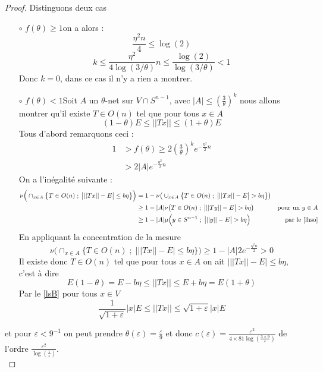 \documentclass[12pt]{article}
\theoremstyle{definition}
\begin{document}
\begin{proof}
	\noindent Distinguons deux cas 
	\begin{enumerate}[leftmargin=\labelsep]
		\item[$\circ$] {$f(\theta)\geq1$}\newline on a alors :
		\begin{equation*}
		\frac{\eta^2n}{4}\leq \log(2)
		\end{equation*}
		\begin{equation*}
		k\leq \frac{\eta^2}{4\log(3/\theta)}n\leq \frac{\log(2)}{\log(3/\theta)}<1
		\end{equation*}
		Donc $k=0$, dans ce cas il n'y a rien a montrer.
		\item[$\circ$] $f(\theta)<1$\newline Soit $A$ un $\theta$-net sur $V\cap S^{n-1}$, avec $|A|\leq(\frac{3}{\theta})^k$ nous allons montrer qu'il existe $T\in O(n)$ tel que pour tous $x\in A$ 
		\begin{equation*}
		(1-\theta) E \leq ||Tx|| \leq (1+ \theta)E
		\end{equation*}
		Tous d'abord remarquons ceci :
		\begin{align*}
		1&>f(\theta)\geq 2(\frac{3}{\theta})^ke^{-\frac{\eta^2}{2}n} \\
		&> 2|A|e^{-\frac{\eta^2}{2}n}
		\end{align*}
		On a l'inégalité suivante : 
		\begin{align*}
		\nu\Big(\cap_{x\in A}\big\{T\in O(n)\; ; \;  \big| ||Tx||-E \big|\leq b\eta\big\}\Big)& = 1-\nu\big(\cup_{x\in A}\big\{T\in O(n)\; ; \; \big| ||Tx||-E \big|>b\eta\big\}\big)& \\
		& \geq 1-|A|\nu\big(T\in O(n)\; ; \; \big| ||Ty||-E \big|>b\eta\big)& \text{pour un $y\in A$}\\
		& \geq 1 - |A|\mu\Big(y\in S^{n-1}\; ;\; \big| ||y||-E \big|>b\eta\Big) & \text{par le \cref{lhso}}
		\end{align*} 
		En appliquant la concentration de la mesure
		\begin{equation*}
		\nu\Big(\cap_{x\in A}\big\{T\in O(n)\; ; \;  \big| ||Tx||-E \big|\leq b\eta\big\}\Big)\geq 1 - |A|2e^{-\frac{\eta^2n}{2}} >0
		\end{equation*}	
		Il existe donc $T\in O(n)$ tel que pour tous $x\in A$ on ait $\big|||Tx||-E \big|\leq b \eta$, c'est à dire 
		\begin{equation*}
		E(1-\theta)=E-b\eta\leq ||Tx||\leq E+b\eta=E(1+\theta)
		\end{equation*}
		Par le \cref{lsB} pour tous $x\in V$
		\begin{equation*}
		\frac{1}{\sqrt{1+\varepsilon}}|x| E\leq ||Tx||\leq \sqrt{1+\varepsilon}|x| E
		\end{equation*}
	\end{enumerate}
	et pour $\varepsilon<9^{-1}$ on peut prendre $\theta(\varepsilon)=\frac{\varepsilon}{9}$ et donc $c(\varepsilon)=\frac{\varepsilon^2}{4\times 81\log(\frac{3\times9}{\varepsilon})} $ de l'ordre $\frac{\varepsilon^2}{\log(\frac{1}{\varepsilon})}$.\\ 
\end{proof}
\end{document}
